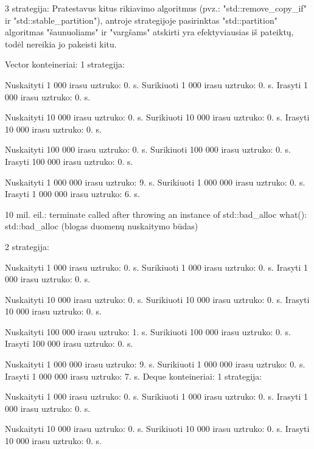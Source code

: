 3 strategija\+: Pratestavus kitus rikiavimo algoritmus (pvz.\+: "{}std\+::remove\+\_\+copy\+\_\+if"{} ir "{}std\+::stable\+\_\+partition"{}), antroje strategijoje pasirinktas "{}std\+::partition"{} algoritmas "{}šaunuoliams"{} ir "{}vargšams"{} atskirti yra efektyviausias iš pateiktų, todėl nereikia jo pakeisti kitu. ~\newline


 Vector konteineriai\+: 1 strategija\+:

Nuskaityti 1 000 irasu uztruko\+: 0. s. Surikiuoti 1 000 irasu uztruko\+: 0. s. Irasyti 1 000 irasu uztruko\+: 0. s.

Nuskaityti 10 000 irasu uztruko\+: 0. s. Surikiuoti 10 000 irasu uztruko\+: 0. s. Irasyti 10 000 irasu uztruko\+: 0. s.

Nuskaityti 100 000 irasu uztruko\+: 0. s. Surikiuoti 100 000 irasu uztruko\+: 0. s. Irasyti 100 000 irasu uztruko\+: 0. s.

Nuskaityti 1 000 000 irasu uztruko\+: 9. s. Surikiuoti 1 000 000 irasu uztruko\+: 0. s. Irasyti 1 000 000 irasu uztruko\+: 6. s.

10 mil. eil.\+: terminate called after throwing an instance of \textquotesingle{}std\+::bad\+\_\+alloc\textquotesingle{} what()\+: std\+::bad\+\_\+alloc (blogas duomenų nuskaitymo būdas)

2 strategija\+:

Nuskaityti 1 000 irasu uztruko\+: 0. s. Surikiuoti 1 000 irasu uztruko\+: 0. s. Irasyti 1 000 irasu uztruko\+: 0. s.

Nuskaityti 10 000 irasu uztruko\+: 0. s. Surikiuoti 10 000 irasu uztruko\+: 0. s. Irasyti 10 000 irasu uztruko\+: 0. s.

Nuskaityti 100 000 irasu uztruko\+: 1. s. Surikiuoti 100 000 irasu uztruko\+: 0. s. Irasyti 100 000 irasu uztruko\+: 0. s.

Nuskaityti 1 000 000 irasu uztruko\+: 9. s. Surikiuoti 1 000 000 irasu uztruko\+: 0. s. Irasyti 1 000 000 irasu uztruko\+: 7. s. 
 Deque konteineriai\+: 1 strategija\+:

Nuskaityti 1 000 irasu uztruko\+: 0. s. Surikiuoti 1 000 irasu uztruko\+: 0. s. Irasyti 1 000 irasu uztruko\+: 0. s.

Nuskaityti 10 000 irasu uztruko\+: 0. s. Surikiuoti 10 000 irasu uztruko\+: 0. s. Irasyti 10 000 irasu uztruko\+: 0. s.

